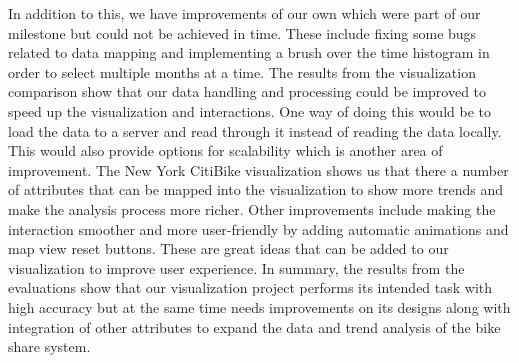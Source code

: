 In addition to this, we have improvements of our own which were part of our milestone but could not be achieved in time. These include fixing some bugs related to data mapping and implementing a brush over the time histogram in order to select multiple months at a time. The results from the visualization comparison show that our data handling and processing could be improved to speed up the visualization and interactions. One way of doing this would be to load the data to a server and read through it instead of reading the data locally. This would also provide options for scalability which is another area of improvement. The New York CitiBike visualization shows us that there a number of attributes that can be mapped into the visualization to show more trends and make the analysis process more richer. Other improvements include making the interaction smoother and more user-friendly by adding automatic animations and map view reset buttons. These are great ideas that can be added to our visualization to improve user experience.\newline
In summary, the results from the evaluations show that our visualization project performs its intended task with high accuracy but at the same time needs improvements on its designs along with integration of other attributes to expand the data and trend analysis of the bike share system.
